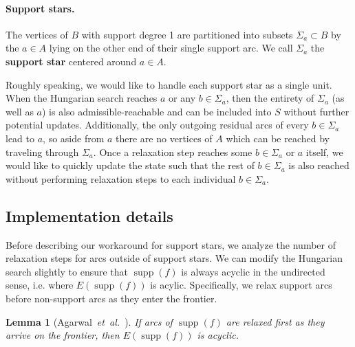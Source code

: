 \documentclass[11pt]{article}
\def\etal{\textit{et~al.}}
\def\supp{\operatorname{supp}}
\theoremstyle{plain}
\newtheorem{lemma}{Lemma}[section]
\numberwithin{figure}{section}
\def\EMPH#1{\textbf{\boldmath #1}}
\begin{document}
\paragraph{Support stars.}
The vertices of $B$ with support degree 1 are partitioned into subsets
$\Sigma_a \subset B$ by the $a \in A$ lying on the other end of their single
support arc.
We call $\Sigma_a$ the \EMPH{support star} centered around $a \in A$.

Roughly speaking, we would like to handle each support star as a single unit.
When the Hungarian search reaches $a$ or any $b \in \Sigma_a$, then the
entirety of $\Sigma_a$ (as well as $a$) is also admissible-reachable and can be
included into $S$ without further potential updates.
Additionally, the only outgoing residual arcs of every $b \in \Sigma_a$ lead to
$a$, so aside from $a$ there are no vertices of $A$ which can be reached by
traveling through $\Sigma_a$.
Once a relaxation step reaches some $b \in \Sigma_a$ or $a$ itself, we would
like to quickly update the state such that the rest of $b \in \Sigma_a$ is also
reached without performing relaxation steps to each individual
$b \in \Sigma_a$.

\subsection{Implementation details}

Before describing our workaround for support stars, we analyze the number of
relaxation steps for arcs outside of support stars.
We can modify the Hungarian search slightly to ensure that $\supp(f)$ is always
acyclic in the undirected sense, i.e. where $E(\supp(f))$ is acylic.
Specifically, we relax support arcs before non-support arcs as they enter the
frontier.

\begin{lemma}[Agarwal~\etal~\cite{AFPVX17}]
\label{lemma:orlin_acyclic}
If arcs of $\supp(f)$ are relaxed first as they arrive on the frontier, then
$E(\supp(f))$ is acyclic.
\end{lemma}
\end{document}
